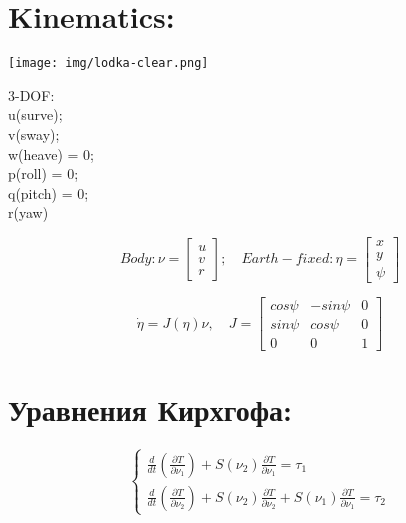 \newpage

\section*{Kinematics:}

\begin{center}
\texttt{[image: img/lodka-clear.png]}\\
\end{center}

3-DOF: \\

u(surve); \\

v(sway); \\

w(heave) = 0; \\

p(roll) = 0; \\

q(pitch) = 0; \\

r(yaw)
\begin{center}
\begin{equation*}
Body: \nu = \begin{bmatrix}
u \\
v \\
r
\end{bmatrix};\quad Earth-fixed: \eta = \begin{bmatrix}
 x \\
 y \\
 \psi
 \end{bmatrix}
\end{equation*}
\end{center}
\begin{equation*}
\Dot{\eta} = J(\eta)\nu, \quad J = \begin{bmatrix}
cos\psi & -sin\psi & 0 \\
sin\psi & cos\psi & 0 \\
0 & 0 & 1
 \end{bmatrix}
\end{equation*}


\newpage
\section*{Уравнения Кирхгофа:}
\large
\begin{equation*}
 \begin{cases}
   \frac{d}{dt}(\frac{\partial T}{\partial \nu_1}) + S(\nu_2)\frac{\partial T}{\partial \nu_1} = \tau_1\\
   \frac{d}{dt}(\frac{\partial T}{\partial \nu_2}) + S(\nu_2)\frac{\partial T}{\partial \nu_2} + S(\nu_1)\frac{\partial T}{\partial \nu_1} = \tau_2
 \end{cases}
 \end{equation*}

